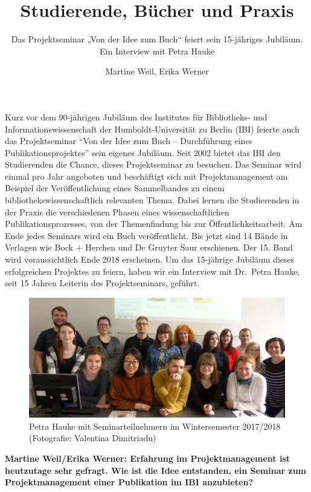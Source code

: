 \documentclass[a4paper,
fontsize=11pt,
oneside,
numbers=noperiodatend,
parskip=half-,
bibliography=totoc,
final
]{scrartcl}
\title{\LARGE{Studierende, Bücher und Praxis}}%
\subtitle{Das Projektseminar „Von der Idee zum Buch“ feiert sein 15-jähriges Jubiläum. Ein Interview mit Petra Hauke}
\author{Martine Weil, Erika Werner} %
\date{}
\begin{document}
\maketitle
\thispagestyle{fancyplain} 


Kurz vor dem 90-jährigen Jubiläum des Institutes für Bibliotheks- und
Informationswissenschaft der Humboldt-Universität zu Berlin (IBI)
feierte auch das Projektseminar \enquote{Von der Idee zum Buch --
Durchführung eines Publikationsprojektes} sein eigenes Jubiläum. Seit
2002 bietet das IBI den Studierenden die Chance, dieses Projektseminar
zu besuchen. Das Seminar wird einmal pro Jahr angeboten und beschäftigt
sich mit Projektmanagement am Beispiel der Veröffentlichung eines
Sammelbandes zu einem bibliothekswissenschaftlich relevanten Thema.
Dabei lernen die Studierenden in der Praxis die verschiedenen Phasen
eines wissenschaftlichen Publikationsprozesses, von der Themenfindung
bis zur Öffentlichkeitsarbeit. Am Ende jedes Seminars wird ein Buch
veröffentlicht. Bis jetzt sind 14 Bände in Verlagen wie Bock + Herchen
und De Gruyter Saur erschienen. Der 15. Band wird voraussichtlich Ende
2018 erscheinen. Um das 15-jährige Jubiläum dieses erfolgreichen
Projektes zu feiern, haben wir ein Interview mit Dr.~Petra Hauke, seit
15 Jahren Leiterin des Projektseminars, geführt.

\begin{figure}[h!]
\centering
\includegraphics[width=15cm]{img/Bild-01.jpg}
\caption{Petra Hauke mit Seminarteilnehmern im Wintersemester
2017/2018 (Fotografie: Valentina Dimitriadu)}
\end{figure}

\pagebreak

\textbf{Martine Weil/Erika Werner: Erfahrung im Projektmanagement ist
heutzutage sehr gefragt. Wie ist die Idee entstanden, ein Seminar zum
Projektmanagement einer Publikation im IBI anzubieten?}
\end{document}
